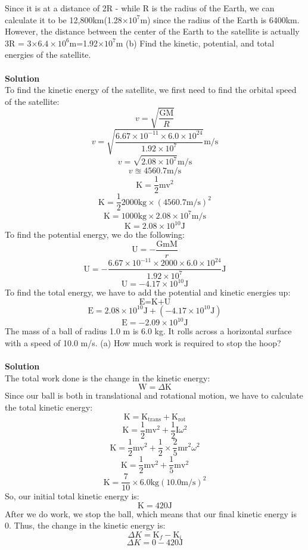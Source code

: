 \documentclass[9pt,addpoints]{exam}
\begin{document}
\begin{questions}
		Since it is at a distance of 2R - while R is the radius of the Earth, we can calculate it to be 12,800km(1.28$\times 10^{7}$m) since the radius of the Earth is 6400km. However, the distance between the center of the Earth to the satellite is actually 3R = 3$\times6.4\times10^6$m=1.92$\times10^7$m		
		(b) Find the kinetic, potential, and total energies of the satellite. \\ \\
		\textbf{Solution} \\
		To find the kinetic energy of the satellite, we first need to find the orbital speed of the satellite:	
		$$v=\sqrt{\dfrac{\text{GM}}{R}}$$
		$$v=\sqrt{\dfrac{6.67\times10^{-11}\times6.0\times10^{24}}{1.92\times10^{7}}}\text{m/s}$$
		$$v=\sqrt{2.08\times10^7}\text{m/s}$$
		$$v\approxeq4560.7\text{m/s}$$
		$$\text{K}=\dfrac{1}{2}\text{mv}^2$$
		$$\text{K}=\dfrac{1}{2}2000\text{kg}\times(4560.7\text{m/s})^2$$
		$$\text{K}=1000\text{kg}\times2.08\times10^7\text{m/s}$$
		$$\text{K}=2.08\times10^{10}\text{J}$$
		To find the potential energy, we do the following:
		$$\text{U}=-\dfrac{\text{GmM}}{r}$$
		$$\text{U}=-\dfrac{6.67\times10^{-11}\times2000\times6.0\times10^{24}}{1.92\times10^7}\text{J}$$
		$$\text{U}=-4.17\times10^{10}\text{J}$$
		To find the total energy, we have to add the potential and kinetic energies up:
		$$\text{E}=\text{K+U}$$
		$$\text{E}=2.08\times10^{10}\text{J}+(-4.17\times10^{10}\text{J})$$
		$$\text{E}=-2.09\times10^{10}\text{J}$$
		\question The mass of a ball of radius 1.0 m is 6.0 kg. It rolls across a horizontal surface with a speed of 10.0 m/s. (a) How much work is required to stop the hoop?  \\ \\ 
		\textbf{Solution} \\
		The total work done is the change in the kinetic energy:
		$$\text{W}=\varDelta\text{K}$$
		Since our ball is both in translational and rotational motion, we have to calculate the total kinetic energy:
		$$\text{K}=\text{K}_{\text{trans}}+\text{K}_{\text{rot}}$$
		$$\text{K}=\dfrac{1}{2}\text{mv}^2+\dfrac{1}{2}\text{I}\omega^2$$
		$$\text{K}=\dfrac{1}{2}\text{mv}^2+\dfrac{1}{2}\times\dfrac{2}{5}\text{mr}^2\omega^2$$
		$$\text{K}=\dfrac{1}{2}\text{mv}^2+\dfrac{1}{5}\text{mv}^2$$	
		$$\text{K}=\dfrac{7}{10}\times6.0\text{kg}(10.0\text{m/s})^2$$
		So, our initial total kinetic energy is:
		$$\text{K}=420\text{J}$$	
		After we do work, we stop the ball, which means that our final kinetic energy is 0. Thus, the change in the kinetic energy is:
		$$\varDelta K=\text{K}_f-\text{K}_i$$
		$$\varDelta K=0-420\text{J}$$

\end{questions}
\end{document}
